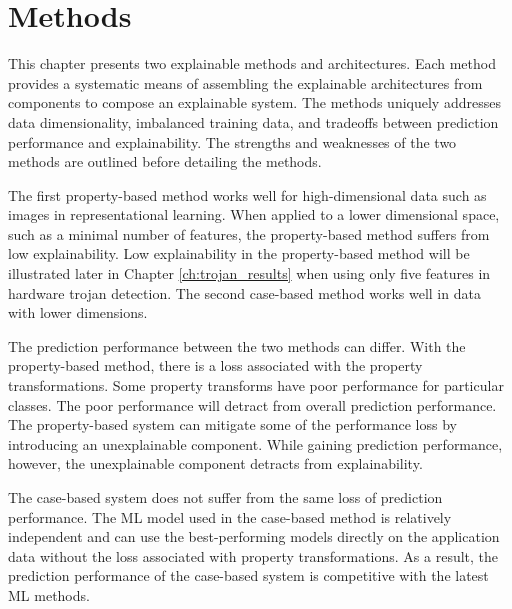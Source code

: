 \chapter{Methods} \label{ch:methods}

This chapter presents two explainable methods and architectures. Each method
provides a systematic means of assembling the explainable architectures from
components to compose an explainable system. The methods uniquely addresses
data dimensionality, imbalanced training data, and tradeoffs between prediction
performance and explainability. The strengths and weaknesses of the two methods
are outlined before detailing the methods.

The first property-based method works well for high-dimensional data such as
images in representational learning. When applied to a lower dimensional space,
such as a minimal number of features, the property-based method suffers from low
explainability. Low explainability in the property-based method will be
illustrated later in Chapter \ref{ch:trojan_results} when using only five
features in hardware trojan detection. The second case-based method works well
in data with lower dimensions.

The prediction performance between the two methods can differ. With the
property-based method, there is a loss associated with the property
transformations. Some property transforms have poor performance for particular
classes. The poor performance will detract from overall prediction performance.
The property-based system can mitigate some of the performance loss by
introducing an unexplainable component. While gaining prediction performance,
however, the unexplainable component detracts from explainability. 

The case-based system does not suffer from the same loss of prediction
performance. The ML model used in the case-based method is relatively
independent and can use the best-performing models directly on the application
data without the loss associated with property transformations. As a result, the
prediction performance of the case-based system is competitive with the latest
ML methods.

